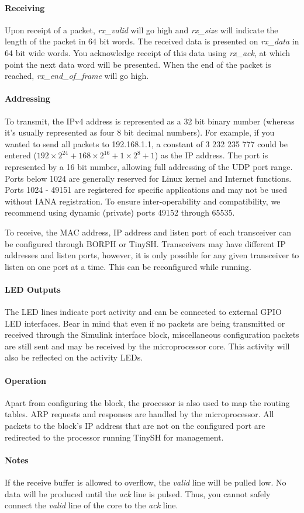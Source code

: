{\paragraph{Receiving}
Upon receipt of a packet, \textit{rx\_valid} will go high and \textit{rx\_size} will indicate the length of the packet in 64 bit words. The received data is presented on \textit{rx\_data} in 64 bit wide words. You acknowledge receipt of this data using \textit{rx\_ack}, at which point the next data word will be presented. When the end of the packet is reached, \textit{rx\_end\_of\_frame} will go high.

\paragraph{Addressing}
To transmit, the IPv4 address is represented as a 32 bit binary number (whereas it's usually represented as four 8 bit decimal numbers). For example, if you wanted to send all packets to 192.168.1.1, a constant of 3 232 235 777 could be entered ($192\times2^{24} + 168\times2^{16} + 1\times2^8 + 1$) as the IP address. The port is represented by a 16 bit number, allowing full addressing of the UDP port range. Ports below 1024 are generally reserved for Linux kernel and Internet functions. Ports 1024 - 49151 are registered for specific applications and may not be used without IANA registration. To ensure inter-operability and compatibility, we recommend using dynamic (private) ports 49152 through 65535.

To receive, the MAC address, IP address and listen port of each transceiver can be configured through BORPH or TinySH. Transceivers may have different IP addresses and listen ports, however, it is only possible for any given transceiver to listen on one port at a time. This can be reconfigured while running.

\paragraph{LED Outputs}
The LED lines indicate port activity and can be connected to external GPIO LED interfaces. Bear in mind that even if no packets are being transmitted or received through the Simulink interface block, miscellaneous configuration packets are still sent and may be received by the microprocessor core. This activity will also be reflected on the activity LEDs.

\paragraph{Operation}
Apart from configuring the block, the processor is also used to map the routing tables. ARP requests and responses are handled by the microprocessor. All packets to the block's IP address that are not on the configured port are redirected to the processor running TinySH for management. 

\paragraph{Notes}
If the receive buffer is allowed to overflow, the \textit{valid} line will be pulled low. No data will be produced until the \textit{ack} line is pulsed. Thus, you cannot safely connect the \textit{valid} line of the core to the \textit{ack} line.
}
